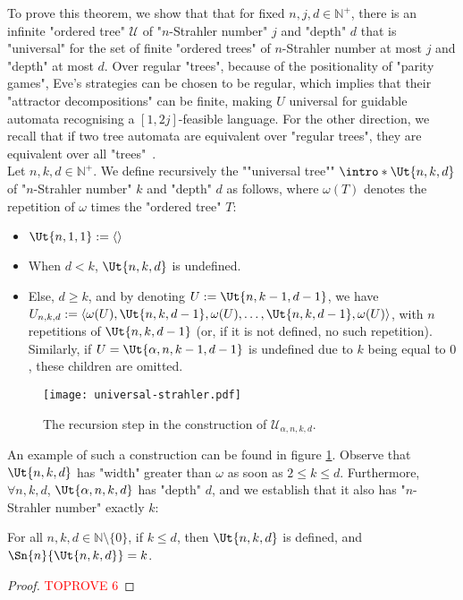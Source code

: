 \documentclass[a4paper,UKenglish,cleveref, autoref, thm-restate]{lipics-v2021}
\newcommand{\NN}{\mathbb{N}}
\newcommand{\U}{\mathcal{U}}
\renewcommand{\leq}{\leqslant}
\renewcommand{\geq}{\geqslant}
\begin{document}
\thmuniversaltrees*

To prove this theorem, we show that that for fixed $n,j,d\in \NN^+$, there is an infinite "ordered tree" $\U$ of "$n$-Strahler number" $j$ and "depth" $d$ that is "universal" for the set of finite "ordered trees" of $n$-Strahler number at most $j$ and "depth" at most $d$. Over regular "trees", because of the positionality of "parity games", Eve's strategies can be chosen to be regular, which implies that their "attractor decompositions" can be finite, making $U$ universal for guidable automata recognising a $[1,2j]$-feasible language. For the other direction, we recall that if two tree automata are equivalent over "regular trees", they are equivalent over all "trees"~\cite{RabinRegular}.\\


\AP Let $n,k,d\in \NN^+$. We define recursively the ""universal tree"" $\intro*\Ut{n,k,d}$
of "$n$-Strahler number" $k$ and "depth" $d$ as follows, where $\omega(T)$ denotes the repetition of $\omega$ times the "ordered tree" $T$:

\begin{itemize}
	\item $\Ut{n,1,1} := \langle \rangle$
	\item When $d<k$, $\Ut{n,k,d}$ is undefined.
	\item Else, $d\geq k$, and by denoting $U := \Ut{n,k-1,d-1}$, we have \\$U_{n,k,d} := \langle \omega(U), \Ut{n,k,d-1}, \omega(U), \dots, \Ut{n,k,d-1}, \omega(U)\rangle$, with $n$ repetitions of $\Ut{n,k,d-1}$ (or, if it is not defined, no such repetition). Similarly, if $U = \Ut{\alpha,n,k-1,d-1}$ is undefined due to $k$ being equal to $0$, these children are omitted.
\end{itemize}



\begin{figure}[!htb]
	\texttt{[image: universal-strahler.pdf]}
	\caption{The recursion step in the construction of $\U_{\alpha,n,k,d}$.}
	\label{fig:univ-strahler}
\end{figure}

An example of such a construction can be found in figure \ref{fig:univ-strahler}.
Observe that $\Ut{n,k,d}$ has "width" greater than $\omega$ as soon as $2\leq k\leq d$.
Furthermore, $\forall n,k,d$, $\Ut{\alpha,n,k,d}$ has "depth" $d$, and we establish that it also has "$n$-Strahler number" exactly $k$:
\begin{lemma}
	For all $n,k,d\in \NN\setminus\{0\}$, if $k\leq d$, then $\Ut{n,k,d}$ is defined, and $\Sn{n} {\Ut{n,k,d}} = k$.
\end{lemma}
\begin{proof}\textcolor{red}{TOPROVE 6}\end{proof}
\end{document}
